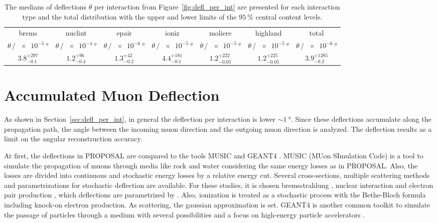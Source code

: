 \documentclass[pdflatex, sn-mathphys]{sn-jnl}%
\theoremstyle{thmstyleone}%
\theoremstyle{thmstyletwo}%
\theoremstyle{thmstylethree}%
\begin{document}
\begin{table}
    \centering 
    \caption{The medians of deflections $\theta$ per interaction from Figure~\ref{fig:defl_per_int} are presented for each interaction type and the total distribution with the upper and lower limits of the $\SI{95}{\percent}$ 
    central content levels.}
    \begin{tabular}{ccccccc}
        \toprule 
        brems & nuclint & epair & ioniz & moliere & highland & total  \vspace{6pt} \\
        $\theta\,/\,\SI{e-5}{\degree}$ & $\theta\,/\,\SI{e-4}{\degree}$ & $\theta\,/\,\SI{e-6}{\degree}$ & $\theta\,/\,\SI{e-5}{\degree}$ & $\theta\,/\,\SI{e-5}{\degree}$ & $\theta\,/\,\SI{e-5}{\degree}$ & $\theta\,/\,\SI{e-6}{\degree}$\\
        \midrule 
        $3.8_{-0.1}^{+297}$ & $1.2_{-0.4}^{+96}$ & $1.3_{-0.2}^{+42}$ & $4.4_{-0.1}^{+181}$& $1.2_{-0.05}^{+222}$ & $1.2_{-0.05}^{+225}$ & $3.9_{-0.2}^{+1285}$\\ 
        \bottomrule
    \end{tabular}
    \label{tab:defl_per_int}
\end{table}

\section{Accumulated Muon Deflection}\label{sec:accum_defl}

As shown in Section~\ref{sec:defl_per_int}, in general the deflection per interaction 
is lower $\sim\SI{1}{\degree}$. Since these deflections accumulate along the 
propagation path, the angle between the incoming muon direction and the outgoing 
muon direction is analyzed. The deflection results as a limit on the 
angular reconstruction accuracy.

At first, the deflections in PROPOSAL are compared to 
the tools MUSIC \cite{MUSIC,comparison_MUSIC_GEANT4_2009} and GEANT4 \cite{GEANT4}.
MUSIC (MUon SImulation Code) is a tool to simulate the propagation of muons 
through media like rock and water considering the same energy losses as in 
PROPOSAL. Also, the losses are divided into continuous and stochastic 
energy losses by a relative energy cut. Several cross-sections, multiple scattering 
methods and parametrizations for stochastic deflection are 
available. For these studies, it is chosen bremsstrahlung \cite{Bremsstrahlung_KKP}, 
nuclear interaction \cite{nulcint_bugaev_Shlepin, bugaev_1980_defl,bugaev_1981_defl} 
and electron pair production \cite{epair_kelner,epair_kokoulin_petrukhin}, 
which deflections are parametrized by \cite{Van_Ginneken}. 
Also, ionization is treated as a stochastic process with the Bethe-Bloch 
formula including knock-on electron production. As scattering, the gaussian 
approximation \cite{HIGHLAND_1975} is set. 
GEANT4 is another common toolkit to simulate the passage of particles through 
a medium with several possibilities and a focus on high-energy 
particle accelerators \cite{GEANT4}. 
\end{document}
